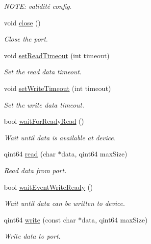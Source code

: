 \begin{DoxyCompactItemize}
\begin{DoxyCompactList}\small\item\em NOTE: validité config. \end{DoxyCompactList}\item 
void \hyperlink{classmdt_serial_port_posix_a29df8d6b7c74bd7e3bf8513987bdd2a2}{close} ()
\begin{DoxyCompactList}\small\item\em Close the port. \end{DoxyCompactList}\item 
void \hyperlink{classmdt_serial_port_posix_a7cea8e6d04dac0645785e8bee7570cea}{setReadTimeout} (int timeout)
\begin{DoxyCompactList}\small\item\em Set the read data timeout. \end{DoxyCompactList}\item 
void \hyperlink{classmdt_serial_port_posix_ac8388d9e5411541ead6eab17c0661001}{setWriteTimeout} (int timeout)
\begin{DoxyCompactList}\small\item\em Set the write data timeout. \end{DoxyCompactList}\item 
bool \hyperlink{classmdt_serial_port_posix_a69ecbfb420544af72301e50635c4ba39}{waitForReadyRead} ()
\begin{DoxyCompactList}\small\item\em Wait until data is available at device. \end{DoxyCompactList}\item 
qint64 \hyperlink{classmdt_serial_port_posix_a55b73a33f1b9552fbb8821e356a8b930}{read} (char $\ast$data, qint64 maxSize)
\begin{DoxyCompactList}\small\item\em Read data from port. \end{DoxyCompactList}\item 
bool \hyperlink{classmdt_serial_port_posix_ac6e29bfccaa92509f6d86848da45bcc1}{waitEventWriteReady} ()
\begin{DoxyCompactList}\small\item\em Wait until data can be written to device. \end{DoxyCompactList}\item 
qint64 \hyperlink{classmdt_serial_port_posix_a3b70bbabeb933e25ad787f606dca0fb6}{write} (const char $\ast$data, qint64 maxSize)
\begin{DoxyCompactList}\small\item\em Write data to port. \end{DoxyCompactList}\item 

\end{DoxyCompactItemize}
